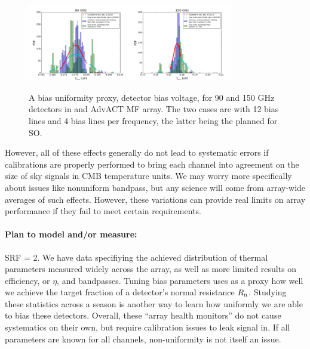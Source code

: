\begin{figure}[h!]
\centering
\includegraphics[width=0.4\textwidth]{figures/bias_volt_90GHz_ACTvsSO.png}\quad\includegraphics[width=0.4\textwidth]{figures/bias_volt_150GHz_ACTvsSO.png}
\caption{A bias uniformity proxy, detector bias voltage, for 90 and 150 GHz detectors in and AdvACT MF array. The two cases are with 12 bias lines and 4 bias lines per frequency, the latter being the planned for SO.}
\label{expect_biasability}
\end{figure}

However, all of these effects generally do not lead to systematic errors if calibrations are properly performed to bring each channel into agreement on the size of sky signals in CMB temperature units. We may worry more specifically about issues like nonuniform bandpass, but any science will come from array-wide averages of such effects. However, these variations can provide real limits on array performance if they fail to meet certain requirements.

\paragraph{Plan to model and/or measure:}
SRF = 2. We have data specifiying the achieved distribution of thermal parameters measured widely across the array, as well as more limited results on efficiency, or $\eta$, and bandpasses. Tuning bias parameters uses as a proxy how well we achieve the target fraction of a detector's normal resistance $R_{\mbox{\scriptsize n}}$. Studying these statistics across a season is another way to learn how uniformly we are able to bias these detectors. Overall, these ``array health monitors'' do not cause systematics on their own, but require calibration issues to leak signal in. If all parameters are known for all channels, non-uniformity is not itself an issue.

